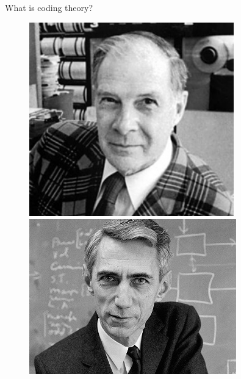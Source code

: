 \documentclass[10pt]{beamer}
\begin{document}
\begin{frame}{What is coding theory?}
    \begin{figure}[ht]
        \centering
        \begin{minipage}{0.32\textwidth}
            \centering
            \includegraphics[width=0.79\textwidth]{img/hamming.jpg}
        \end{minipage}\hfill
        \begin{minipage}{0.32\textwidth}
            \centering
            \includegraphics[width=\textwidth]{img/shannon.jpg}
        \end{minipage}\hfill
        \begin{minipage}{0.32\textwidth}
            \centering

\end{minipage}
\end{figure}
\end{frame}
\end{document}
